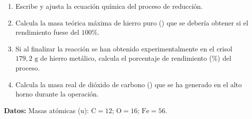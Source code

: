 ﻿\documentclass[11pt,a4paper]{article}
\begin{document}
\begin{enumerate}[label=\textbf{\alph*)}, leftmargin=2em, itemsep=12pt]
    \item Escribe y ajusta la ecuación química del proceso de reducción.
    \item Calcula la masa teórica máxima de hierro puro () que se debería obtener si el rendimiento fuese del $100\%$.
    \item Si al finalizar la reacción se han obtenido experimentalmente en el crisol $179{,}2\text{ g}$ de hierro metálico, calcula el porcentaje de rendimiento ($\%$) del proceso.
    \item Calcula la masa real de dióxido de carbono () que se ha generado en el alto horno durante la operación.
\end{enumerate}

\vspace{0.5cm}
\noindent\textbf{Datos:} Masas atómicas ($\text{u}$): $\mathrm{C} = 12$; $\mathrm{O} = 16$; $\mathrm{Fe} = 56$.
\end{document}
